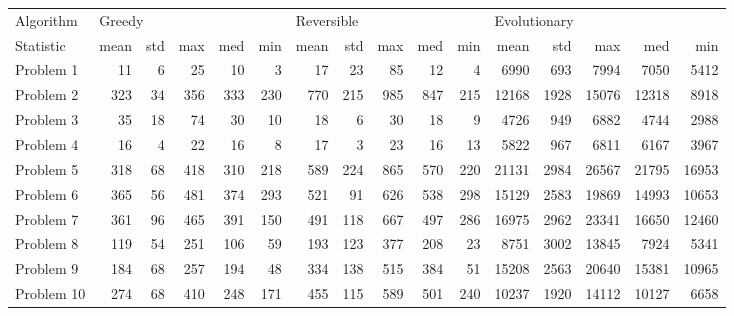 \begin{tabular}{lrrrrrrrrrrrrrrr}
\toprule
Algorithm & \multicolumn{5}{l}{Greedy} & \multicolumn{5}{l}{Reversible} & \multicolumn{5}{l}{Evolutionary} \\
Statistic &   mean & std &  max &  med &  min &       mean &  std &  max &  med &  min &         mean &   std &    max &    med &    min \\
\midrule
Problem 1  &     11 &   6 &   25 &   10 &    3 &         17 &   23 &   85 &   12 &    4 &         6990 &   693 &   7994 &   7050 &   5412 \\
Problem 2  &    323 &  34 &  356 &  333 &  230 &        770 &  215 &  985 &  847 &  215 &        12168 &  1928 &  15076 &  12318 &   8918 \\
Problem 3  &     35 &  18 &   74 &   30 &   10 &         18 &    6 &   30 &   18 &    9 &         4726 &   949 &   6882 &   4744 &   2988 \\
Problem 4  &     16 &   4 &   22 &   16 &    8 &         17 &    3 &   23 &   16 &   13 &         5822 &   967 &   6811 &   6167 &   3967 \\
Problem 5  &    318 &  68 &  418 &  310 &  218 &        589 &  224 &  865 &  570 &  220 &        21131 &  2984 &  26567 &  21795 &  16953 \\
Problem 6  &    365 &  56 &  481 &  374 &  293 &        521 &   91 &  626 &  538 &  298 &        15129 &  2583 &  19869 &  14993 &  10653 \\
Problem 7  &    361 &  96 &  465 &  391 &  150 &        491 &  118 &  667 &  497 &  286 &        16975 &  2962 &  23341 &  16650 &  12460 \\
Problem 8  &    119 &  54 &  251 &  106 &   59 &        193 &  123 &  377 &  208 &   23 &         8751 &  3002 &  13845 &   7924 &   5341 \\
Problem 9  &    184 &  68 &  257 &  194 &   48 &        334 &  138 &  515 &  384 &   51 &        15208 &  2563 &  20640 &  15381 &  10965 \\
Problem 10 &    274 &  68 &  410 &  248 &  171 &        455 &  115 &  589 &  501 &  240 &        10237 &  1920 &  14112 &  10127 &   6658 \\
\bottomrule
\end{tabular}
